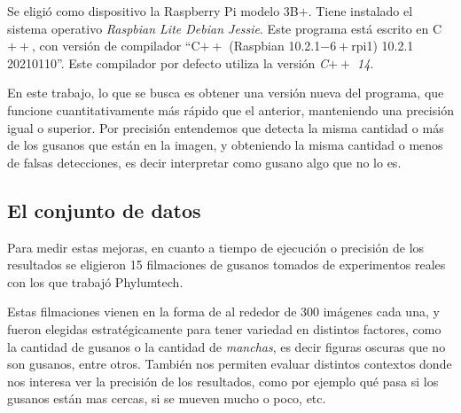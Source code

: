 \documentclass{article}
\begin{document}
Se eligió como dispositivo la Raspberry Pi modelo 3B$+$. Tiene instalado el sistema operativo \emph{Raspbian Lite Debian Jessie}. Este programa está escrito en C$++$, con versión de compilador ``C$++$ (Raspbian 10.2.1$-6+$rpi1) 10.2.1 20210110''. Este compilador por defecto utiliza la versión \emph{C$++$ 14}.

En este trabajo, lo que se busca es obtener una versión nueva del programa, que funcione cuantitativamente más rápido que el anterior, manteniendo una precisión igual o superior. Por precisión entendemos que detecta la misma cantidad o más de los gusanos que están en la imagen, y obteniendo la misma cantidad o menos de falsas detecciones, es decir interpretar como gusano algo que no lo es.

\subsection{El conjunto de datos}

Para medir estas mejoras, en cuanto a tiempo de ejecución o precisión de los resultados se eligieron 15 filmaciones de gusanos tomados de experimentos reales con los que trabajó Phylumtech.

Estas filmaciones vienen en la forma de al rededor de 300 imágenes cada una, y fueron elegidas estratégicamente para tener variedad en distintos factores, como la cantidad de gusanos o la cantidad de \emph{manchas}, es decir figuras oscuras que no son gusanos, entre otros. También nos permiten evaluar distintos contextos donde nos interesa ver la precisión de los resultados, como por ejemplo qué pasa si los gusanos están mas cercas, si se mueven mucho o poco, etc.

\end{document}

